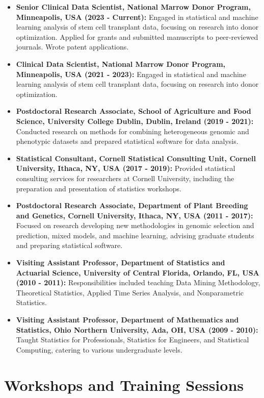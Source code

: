 \documentclass[11pt,a4paper,]{moderncv}
\providecommand{\tightlist}{%
	\setlength{\itemsep}{0pt}\setlength{\parskip}{0pt}}
\begin{document}
\begin{itemize}
\tightlist
\item
  \textbf{Senior Clinical Data Scientist, National Marrow Donor Program,
  Minneapolis, USA (2023 - Current):} Engaged in statistical and machine
  learning analysis of stem cell transplant data, focusing on research
  into donor optimization. Applied for grants and submitted manuscripts
  to peer-reviewed journals. Wrote patent applications.
\item
  \textbf{Clinical Data Scientist, National Marrow Donor Program,
  Minneapolis, USA (2021 - 2023):} Engaged in statistical and machine
  learning analysis of stem cell transplant data, focusing on research
  into donor optimization.
\item
  \textbf{Postdoctoral Research Associate, School of Agriculture and
  Food Science, University College Dublin, Dublin, Ireland (2019 -
  2021):} Conducted research on methods for combining heterogeneous
  genomic and phenotypic datasets and prepared statistical software for
  data analysis.
\item
  \textbf{Statistical Consultant, Cornell Statistical Consulting Unit,
  Cornell University, Ithaca, NY, USA (2017 - 2019):} Provided
  statistical consulting services for researchers at Cornell University,
  including the preparation and presentation of statistics workshops.
\item
  \textbf{Postdoctoral Research Associate, Department of Plant Breeding
  and Genetics, Cornell University, Ithaca, NY, USA (2011 - 2017):}
  Focused on research developing new methodologies in genomic selection
  and prediction, mixed models, and machine learning, advising graduate
  students and preparing statistical software.
\item
  \textbf{Visiting Assistant Professor, Department of Statistics and
  Actuarial Science, University of Central Florida, Orlando, FL, USA
  (2010 - 2011):} Responsibilities included teaching Data Mining
  Methodology, Theoretical Statistics, Applied Time Series Analysis, and
  Nonparametric Statistics.
\item
  \textbf{Visiting Assistant Professor, Department of Mathematics and
  Statistics, Ohio Northern University, Ada, OH, USA (2009 - 2010):}
  Taught Statistics for Professionals, Statistics for Engineers, and
  Statistical Computing, catering to various undergraduate levels.
\end{itemize}

\section{Workshops and Training
Sessions}\label{workshops-and-training-sessions-1}
\end{document}
